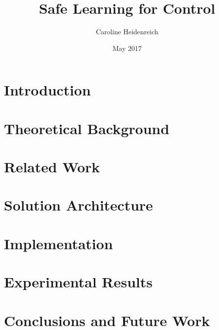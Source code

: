 \documentclass[a4paper,11pt]{kth-mag}
\title{Safe Learning for Control}
\author{Caroline Heidenreich}
\date{May 2017}
\begin{document}
\setlength{\parindent}{0pt}
\setlength{\parskip}{0.5em}
\maketitle

\tableofcontents*
\mainmatter
\chapter{Introduction}\label{sec:Introduction}


\chapter{Theoretical Background}\label{sec:TheoreticalBackground}



\chapter{Related Work}\label{sec:RelatedWork}


\chapter{Solution Architecture}\label{sec:SolutionArchitecture}


\chapter{Implementation}\label{sec:Implementation}


\chapter{Experimental Results}\label{sec:Results}


\chapter{Conclusions and Future Work}\label{sec:Conclusions}





\end{document}
